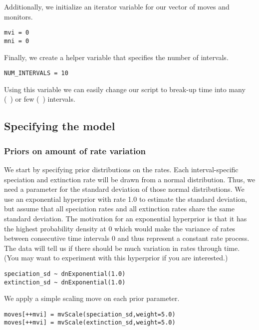 Additionally, we initialize an iterator variable for our vector of moves and monitors.
{\tt \begin{snugshade*}
\begin{lstlisting}
mvi = 0
mni = 0
\end{lstlisting}
\end{snugshade*}}

Finally, we create a helper variable that specifies the number of intervals.
{\tt \begin{snugshade*}
\begin{lstlisting}
NUM_INTERVALS = 10
\end{lstlisting}
\end{snugshade*}}
Using this variable we can easily change our script to break-up time into many (\EG~) or few (\EG~) intervals.



\subsection{Specifying the model}

\subsubsection{Priors on amount of rate variation}
We start by specifying prior distributions on the rates.
Each interval-specific speciation and extinction rate will be drawn from a normal distribution.
Thus, we need a parameter for the standard deviation of those normal distributions.
We use an exponential hyperprior with rate 1.0 to estimate the standard deviation, but assume that all speciation rates and all extinction rates share the same standard deviation.
The motivation for an exponential hyperprior is that it has the highest probability density at 0 which would make the variance of rates between consecutive time intervals 0 and thus represent a constant rate process.
The data will tell us if there should be much variation in rates through time.
(You may want to experiment with this hyperprior if you are interested.)
{\tt \begin{snugshade*}
\begin{lstlisting}
speciation_sd ~ dnExponential(1.0)
extinction_sd ~ dnExponential(1.0)
\end{lstlisting}
\end{snugshade*}}
We apply a simple scaling move on each prior parameter.
{\tt \begin{snugshade*}
\begin{lstlisting}
moves[++mvi] = mvScale(speciation_sd,weight=5.0)
moves[++mvi] = mvScale(extinction_sd,weight=5.0)
\end{lstlisting}
\end{snugshade*}}



